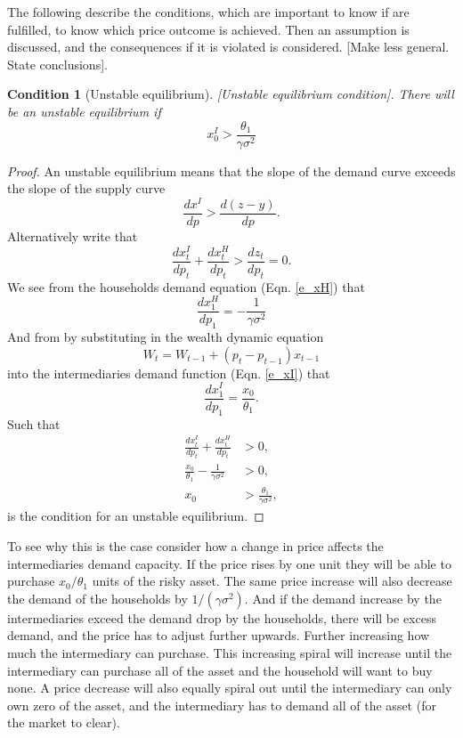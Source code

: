 \documentclass[11pt]{article}
\newtheorem{condition}{Condition}
\begin{document}
The following describe the conditions, which are important to know if are fulfilled, to know which price outcome is achieved. Then an assumption is discussed, and the consequences if it is violated is considered. [Make less general. State conclusions].

\begin{condition}[Unstable equilibrium] \label{c_unstable}
[Unstable equilibrium condition]. There will be an unstable equilibrium if
\begin{equation}
x_0^I > \frac{\theta_1}{\gamma \sigma^2}
\end{equation}
\end{condition}
\begin{proof}
An unstable equilibrium means that the slope of the demand curve exceeds the slope of the supply curve
\begin{equation*}
\frac{d x^I}{dp} > \frac{ d (z-y)}{dp}.
\end{equation*}
Alternatively write that 
\begin{equation*}
\frac{d x^I_t}{dp_t} + \frac{d x^H_t}{dp_t} > \frac{dz_t}{dp_t} = 0.
\end{equation*}
We see from the households demand equation (Eqn. \ref{e_xH}) that 
\begin{equation*}
\frac{d x^H_1}{dp_1} = -\frac{1}{\gamma \sigma^2}
\end{equation*}
And from by substituting in the wealth dynamic equation
\begin{equation}
W_{t} = W_{t-1} + (p_{t}-p_{t-1})x_{t-1}
\end{equation}
into the intermediaries demand function (Eqn. \ref{e_xI}) that
\begin{equation*}
\frac{d x^I_1}{dp_1} = \frac{x_0}{\theta_1}.
\end{equation*}
Such that
\begin{align*}
\frac{d x^I_t}{dp_t} + \frac{d x^H_t}{dp_t} &> 0,\\
\frac{x_0}{\theta_1} - \frac{1}{\gamma \sigma^2} &> 0,\\
x_0 &> \frac{\theta_1}{\gamma \sigma^2},
\end{align*}
is the condition for an unstable equilibrium.
\end{proof}

To see why this is the case consider how a change in price affects the intermediaries demand capacity. If the price rises by one unit they will be able to purchase $x_0/\theta_1$ units of the risky asset. The same price increase will also decrease the demand of the households by $1/(\gamma \sigma^2)$. And if the demand increase by the intermediaries exceed the demand drop by the households, there will be excess demand, and the price has to adjust further upwards. Further increasing how much the intermediary can purchase. This increasing spiral will increase until the intermediary can purchase all of the asset and the household will want to buy none. A price decrease will also equally spiral out until the intermediary can only own zero of the asset, and the intermediary has to demand all of the asset (for the market to clear). 
\end{document}
